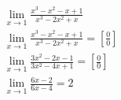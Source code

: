 \begin{ex}
\begin{align}
&\lim_{x\rightarrow 1} \frac{x^3-x^2-x+1}{x^3-2x^2+x}\nonumber\\
&\lim_{x\rightarrow 1} \frac{x^3-x^2-x+1}{x^3-2x^2+x} = \left[\frac{0}{0}\right]\nonumber\\
&\lim_{x\rightarrow 1} \frac{3x^2-2x-1}{3x^2-4x+1}=\left[\frac{0}{0}\right]\nonumber\\
&\lim_{x\rightarrow 1} \frac{6x-2}{6x-4}=2\nonumber
\end{align}
\end{ex}